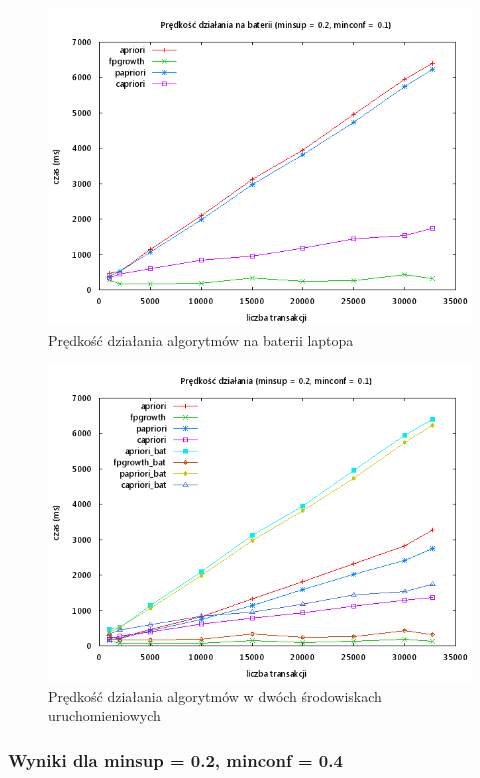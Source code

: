 \begin{figure}[ht]
\centering
\includegraphics[width=1.1\textwidth]{figures/06/02_01_bat.png}
\caption{Prędkość działania algorytmów na baterii laptopa}
\end{figure}

\begin{figure}[ht]
\centering
\includegraphics[width=1.1\textwidth]{figures/06/02_01_all.png}
\caption{Prędkość działania algorytmów w dwóch środowiskach uruchomieniowych}
\end{figure}

\subsubsection{Wyniki dla minsup = 0.2, minconf = 0.4}


